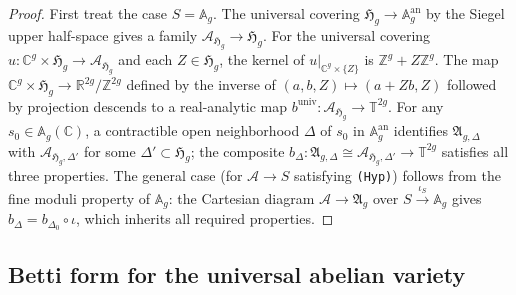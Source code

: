 \begin{proof}
  First treat the case \(S = \mathbb{A}_g\). The universal covering
  \(\mathfrak{H}_g \to \mathbb{A}_g^{\mathrm{an}}\) by the Siegel upper half-space
  gives a family \(\mathcal{A}_{\mathfrak{H}_g} \to \mathfrak{H}_g\).
  For the universal covering \(u \colon \mathbb{C}^g \times \mathfrak{H}_g \to \mathcal{A}_{\mathfrak{H}_g}\)
  and each \(Z \in \mathfrak{H}_g\), the kernel of \(u|_{\mathbb{C}^g \times \{Z\}}\)
  is \(\mathbb{Z}^g + Z\mathbb{Z}^g\). The map
  \(\mathbb{C}^g \times \mathfrak{H}_g \to \mathbb{R}^{2g}/\mathbb{Z}^{2g}\)
  defined by the inverse of \((a,b,Z) \mapsto (a + Zb, Z)\) followed by projection
  descends to a real-analytic map \(b^{\mathrm{univ}} \colon \mathcal{A}_{\mathfrak{H}_g} \to \mathbb{T}^{2g}\).
  For any \(s_0 \in \mathbb{A}_g(\mathbb{C})\), a contractible open neighborhood
  \(\Delta\) of \(s_0\) in \(\mathbb{A}_g^{\mathrm{an}}\) identifies
  \(\mathfrak{A}_{g,\Delta}\) with \(\mathcal{A}_{\mathfrak{H}_g,\Delta'}\) for some
  \(\Delta' \subset \mathfrak{H}_g\); the composite \(b_\Delta \colon \mathfrak{A}_{g,\Delta}
  \cong \mathcal{A}_{\mathfrak{H}_g,\Delta'} \to \mathbb{T}^{2g}\) satisfies all three
  properties.
  The general case (for \(\mathcal{A} \to S\) satisfying {\tt (Hyp)}) follows from
  the fine moduli property of \(\mathbb{A}_g\): the Cartesian diagram
  \(\mathcal{A} \to \mathfrak{A}_g\) over \(S \xrightarrow{\iota_S} \mathbb{A}_g\)
  gives \(b_\Delta = b_{\Delta_0} \circ \iota\), which inherits all required properties.
\end{proof}

\subsection{Betti form for the universal abelian variety}

